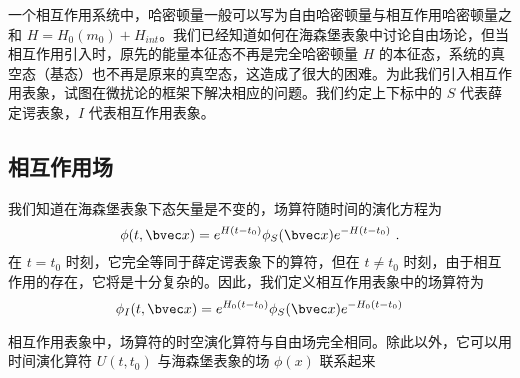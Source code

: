 
一个相互作用系统中，哈密顿量一般可以写为自由哈密顿量与相互作用哈密顿量之和 $H=H_0(m_0)+H_{int}$。我们已经知道如何在海森堡表象中讨论自由场论，但当相互作用引入时，原先的能量本征态不再是完全哈密顿量 $H$ 的本征态，系统的真空态（基态）也不再是原来的真空态，这造成了很大的困难。为此我们引入相互作用表象，试图在微扰论的框架下解决相应的问题。我们约定上下标中的 $S$ 代表薛定谔表象，$I$ 代表相互作用表象。
\subsection{相互作用场}
我们知道在海森堡表象下态矢量是不变的，场算符随时间的演化方程为
\begin{equation}
\phi(t,\bvec x)=e^{H(t-t_0)}\phi_S(\bvec x)e^{-H(t-t_0)}~.
\end{equation}
在 $t=t_0$ 时刻，它完全等同于薛定谔表象下的算符，但在 $t\neq t_0$ 时刻，由于相互作用的存在，它将是十分复杂的。因此，我们定义相互作用表象中的场算符为
\begin{equation}
\phi_I(t,\bvec x)=e^{H_0(t-t_0)}\phi_S(\bvec x)e^{-H_0(t-t_0)}
\end{equation}

相互作用表象中，场算符的时空演化算符与自由场完全相同。除此以外，它可以用时间演化算符 $U(t,t_0)$ 与海森堡表象的场 $\phi(x)$ 联系起来

